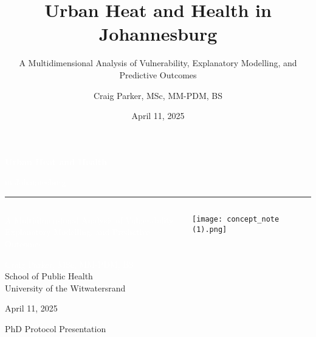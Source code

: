 \documentclass[aspectratio=169]{beamer}
\title[Urban Heat \& Health]{Urban Heat and Health in Johannesburg}
\subtitle{A Multidimensional Analysis of Vulnerability, Explanatory Modelling, and Predictive Outcomes}
\author[Craig Parker]{Craig Parker, MSc, MM-PDM, BS}
\institute[Wits University]{School of Public Health\\University of the Witwatersrand}
\date{April 11, 2025}
\begin{document}
\begingroup
{}
\begin{frame}[plain]
    \begin{center}
        \vspace{-0.8cm}  %
        \textcolor{white}{\Huge\textbf{Urban Heat and Health}}
        \vspace{0.2cm}  %
        
        \textcolor{white}{\Large in Johannesburg}
        \vspace{0.1cm}  %
        
        \textcolor{witsyellow}{\rule{0.7\textwidth}{2pt}}
        \vspace{0.3cm}  %
        
        \begin{columns}[T,totalwidth=\textwidth]
            \begin{column}{0.68\textwidth}  %
                \textcolor{white}{\large A Multidimensional Analysis of Vulnerability,}\\
                \textcolor{white}{\large Explanatory Modelling, and Predictive Outcomes}
                \vspace{1cm}  %
                
                \textcolor{white}{\normalsize Craig Parker, MSc, MM-PDM, BS}\\
                \textcolor{witslight}{\normalsize School of Public Health}\\
                \textcolor{witslight}{\normalsize University of the Witwatersrand}
                \vspace{0.2cm}  %
                
                \textcolor{witsaccent}{April 11, 2025}
                \vspace{0.3cm}  %
                
                \textcolor{witslight}{\small PhD Protocol Presentation}
            \end{column}
            \begin{column}{0.28\textwidth}  %
                \vspace{-0.5cm}  %
                \texttt{[image: concept\_note (1).png]}
            \end{column}
        \end{columns}
    \end{center}
\end{frame}
\endgroup
\end{document}
